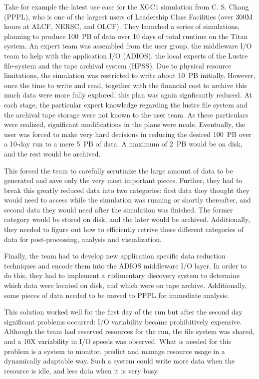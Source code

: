 Take for example the latest use case for the XGC1 simulation from C. S. Chang (PPPL), who is one of the largest users of Leadership Class Facilities (over 300M hours at ALCF, NERSC, and OLCF). They launched a series of simulations, planning to produce 100~PB of data over 10 days of total runtime on the Titan system. An expert team was assembled from the user group, the middleware I/O team to help with the application I/O (ADIOS), the local experts of the Lustre file-system and the tape archival system (HPSS). Due to physical resource limitations, the simulation was restricted to write about 10~PB initially. However, once the time to write and read, together with the financial cost to archive this much data were more fully explored, this plan was again signficantly reduced. At each stage, the particular expert knowledge regarding the lustre file system and the archival tape storage were not known to the user team. As these particulars were realized, significant modifications in the plans were made. Eventually, the user was forced to make very hard decisions in reducing the desired 100~PB over a 10-day run to a mere 5~PB of data. A maximum of 2~PB would be on disk, and the rest would be archived.

This forced the team to carefully scrutinize the large amount of data to be generated and save only the very most important pieces. Further, they had to break this greatly reduced data into two categories: first data they thought they would need to access while the simulation was running or shortly thereafter, and second data they would need after the simulation was finished. The former category would be stored on disk, and the later would be archived. Additionally, they needed to figure out how to efficiently retrive these different categories of data for post-processing, analysis and visualization.

Finally, the team had to develop new application specific data reduction techniques and encode them into the ADIOS middleware I/O layer. In order to do this, they had to implement a rudimentary discovery system to determine which data were located on disk, and which were on tape archive.  Additionally, some pieces of data needed to be moved to PPPL for immediate analysis.

This solution worked well for the first day of the run but after the second day significant problems occurred: I/O variability became prohibitively expensive. Although the team had reserved resources for the run, the file system was shared, and a 10X variability in I/O speeds was observed. What is needed for this problem is a system to monitor, predict and manage resource usage in a dynamically adaptable way. Such a system could write more data when the resource is idle, and less data when it is very busy.


